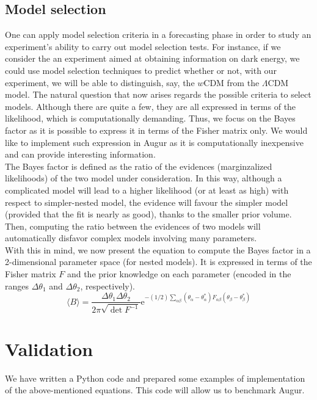 \documentclass[modern]{lsstdescnote}
\begin{document}
\subsection{Model selection}
One can apply model selection criteria in a forecasting phase in order to study an experiment's ability to carry out model selection tests.
For instance, if we consider the an experiment aimed at obtaining information on dark energy, we could use model selection techniques to predict whether or not,
with our experiment, we will be able to distinguish, say, the $w$CDM from the $\Lambda$CDM model.
The natural question that now arises regards the possible criteria to select models. Although there are quite a few, they are all expressed in terms of the likelihood,
which is computationally demanding. Thus, we focus on the Bayes factor as it is possible to express it in terms of the Fisher matrix only. We would like to implement
such expression in Augur as it is computationally inexpensive and can provide interesting information.\\
The Bayes factor is defined as the ratio of the evidences (marginzalized likelihoods) of the two model under consideration.
In this way, although a complicated model will lead to a higher likelihood (or at least as high) with respect to simpler-nested model, the evidence will favour
the simpler model (provided that the fit is nearly as good), thanks to the smaller prior volume. 
Then, computing the ratio between the evidences of two models will automatically disfavor complex models involving many parameters.\\
With this in mind, we now present the equation to compute the Bayes factor in a 2-dimensional parameter space (for nested models). It is expressed in terms of the Fisher matrix $F$ and the prior knowledge
on each parameter (encoded in the ranges $\Delta \theta_{1}$ and $\Delta \theta_{2}$, respectively). 
\begin{equation}
  \langle B\rangle=\frac{\Delta \theta_{1} \Delta \theta_{2}}{2 \pi \sqrt{\operatorname{det} F^{-1}}} \mathrm{e}^{-(1 / 2) \sum_{\alpha \beta}\left(\theta_{\alpha}-\theta_{\alpha}^{*}\right) F_{\alpha \beta}\left(\theta_{\beta}-\theta_{\beta}^{*}\right)}
  \end{equation}
\section{Validation}
We have written a Python code and prepared some examples of implementation of the above-mentioned equations. This code will allow
us to benchmark Augur. 
\end{document}
